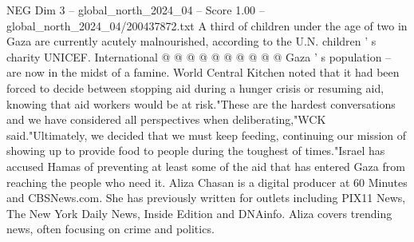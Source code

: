 \begin{textsample}{NEG Dim 3 – global\_north\_2024\_04 – Score 1.00 – global\_north\_2024\_04/200437872.txt}
A third of children under the age of two in Gaza are currently acutely malnourished, according to the U.N. children ' s charity UNICEF.
International @ @ @ @ @ @ @ @ @ @ Gaza ' s population -- are now in the midst of a famine.
World Central Kitchen noted that it had been forced to decide between stopping aid during a hunger crisis or resuming aid, knowing that aid workers would be at risk."These are the hardest conversations and we have considered all perspectives when deliberating,"WCK said."Ultimately, we decided that we must keep feeding, continuing our mission of showing up to provide food to people during the toughest of times."Israel has accused Hamas of preventing at least some of the aid that has entered Gaza from reaching the people who need it.
Aliza Chasan is a digital producer at 60 Minutes and CBSNews.com.
She has previously written for outlets including PIX11 News, The New York Daily News, Inside Edition and DNAinfo.
Aliza covers trending news, often focusing on crime and politics.

\end{textsample}
